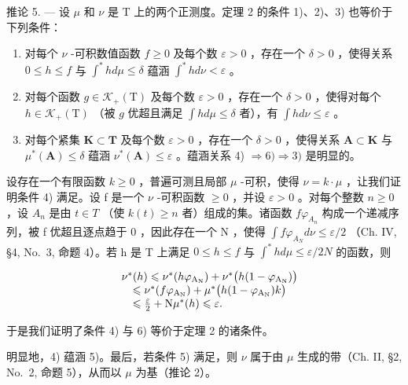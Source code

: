 推论 5. --- 设 \(\mu\) 和 \(\nu\) 是 T 上的两个正测度。定理 2 的条件 1)、2)、3) 也等价于下列条件：

\begin{enumerate}
\def\labelenumi{\arabic{enumi})}
\setcounter{enumi}{3}
\item
  对每个 \(\nu\) -可积数值函数 \(f \geqslant 0\) 及每个数 \(\varepsilon > 0\) ，存在一个 \(\delta > 0\) ，使得关系 \(0 \leqslant h \leqslant f\) 与 \(\int^{*} h d\mu \leqslant \delta\) 蕴涵 \(\int^{*} h d\nu < \varepsilon\) 。
\item
  对每个函数 \(g \in \mathcal{K}_{+}(\mathrm{T})\) 及每个数 \(\varepsilon > 0\) ，存在一个 \(\delta > 0\) ，使得对每个 \(h \in \mathcal{K}_{+}(\mathrm{T})\) （被 \(g\) 优超且满足 \(\int h d\mu \leqslant \delta\) 者），有 \(\int h d\nu \leqslant \varepsilon\) 。
\item
  对每个紧集 \(\mathbf{K} \subset \mathbf{T}\) 及每个数 \(\varepsilon > 0\) ，存在一个 \(\delta > 0\) ，使得关系 \(\mathbf{A} \subset \mathbf{K}\) 与 \(\mu^{*}(\mathbf{A}) \leqslant \delta\) 蕴涵 \(\nu^{*}(\mathbf{A}) \leqslant \varepsilon\) 。蕴涵关系 4) \(\Rightarrow 6) \Rightarrow 3)\) 是明显的。
\end{enumerate}

设存在一个有限函数 \(k \geqslant 0\) ，普遍可测且局部 \(\mu\) -可积，使得 \(\nu = k \cdot \mu\) ，让我们证明条件 4) 满足。设 f 是一个 \(\nu\) -可积函数 \(\geqslant 0\) ，并设 \(\varepsilon > 0\) 。对每个整数 \(n \geqslant 0\) ，设 \(A_{n}\) 是由 \(t \in T\) （使 \(k(t) \geqslant n\) 者）组成的集。诸函数 \(f\varphi_{A_{n}}\) 构成一个递减序列，被 f 优超且逐点趋于 0 ，因此存在一个 N ，使得 \(\int f\varphi_{A_{N}} d\nu \leqslant \varepsilon/2\) （Ch. IV, §4, No.~3, 命题 4）。若 h 是 T 上满足 \(0 \leqslant h \leqslant f\) 与 \(\int^{*} h d\mu \leqslant \varepsilon/2N\) 的函数，则

\[
\begin{array}{r l} & {\nu^ {*} (h) \leqslant \nu^ {*} (h \varphi_ {\mathrm {A_ {N}}}) + \nu^ {*} \big (h (1 - \varphi_ {\mathrm {A_ {N}}}) \big)} \\ & {\quad \leqslant \nu^ {*} (f \varphi_ {\mathrm {A_ {N}}}) + \mu^ {*} \big (h (1 - \varphi_ {\mathrm {A_ {N}}}) k \big)} \\ & {\quad \leqslant \frac {\varepsilon}{2} + \mathrm{N} \mu^ {*} (h) \leqslant \varepsilon .} \end{array}
\]

于是我们证明了条件 4) 与 6) 等价于定理 2 的诸条件。

明显地，4) 蕴涵 5)。最后，若条件 5) 满足，则 \(\nu\) 属于由 \(\mu\) 生成的带（Ch. II, §2, No.~2, 命题 5），从而以 \(\mu\) 为基（推论 2）。

